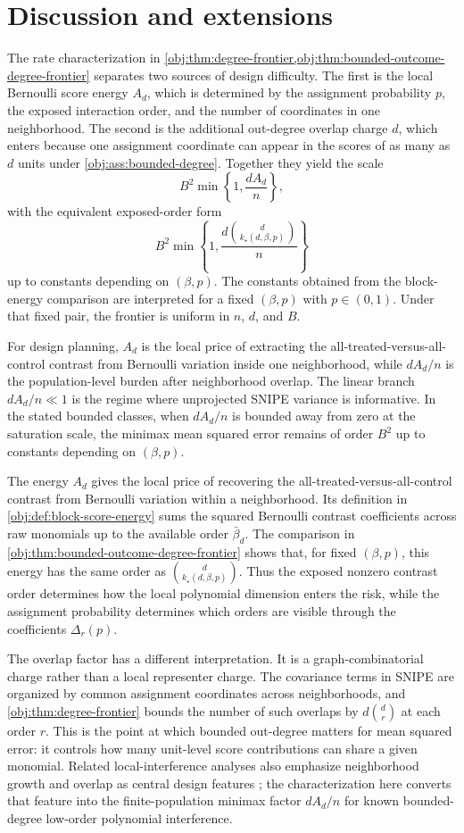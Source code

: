 \section{Discussion and extensions}

The rate characterization in \cref{obj:thm:degree-frontier,obj:thm:bounded-outcome-degree-frontier} separates two sources of design difficulty. The first is the local Bernoulli score energy \(A_d\), which is determined by the assignment probability \(p\), the exposed interaction order, and the number of coordinates in one neighborhood. The second is the additional out-degree overlap charge \(d\), which enters because one assignment coordinate can appear in the scores of as many as \(d\) units under \cref{obj:ass:bounded-degree}. Together they yield the scale
\[
B^2\min\left\{1,\frac{dA_d}{n}\right\},
\]
with the equivalent exposed-order form
\[
B^2\min\left\{1,\frac{d\binom d{k_\star(d,\beta,p)}}{n}\right\}
\]
up to constants depending on \((\beta,p)\). The constants obtained from the block-energy comparison are interpreted for a fixed \((\beta,p)\) with \(p\in(0,1)\). Under that fixed pair, the frontier is uniform in \(n\), \(d\), and \(B\).

For design planning, \(A_d\) is the local price of extracting the all-treated-versus-all-control contrast from Bernoulli variation inside one neighborhood, while \(dA_d/n\) is the population-level burden after neighborhood overlap. The linear branch \(dA_d/n\ll1\) is the regime where unprojected SNIPE variance is informative. In the stated bounded classes, when \(dA_d/n\) is bounded away from zero at the saturation scale, the minimax mean squared error remains of order \(B^2\) up to constants depending on \((\beta,p)\).

The energy \(A_d\) gives the local price of recovering the all-treated-versus-all-control contrast from Bernoulli variation within a neighborhood. Its definition in \cref{obj:def:block-score-energy} sums the squared Bernoulli contrast coefficients across raw monomials up to the available order \(\bar\beta_d\). The comparison in \cref{obj:thm:bounded-outcome-degree-frontier} shows that, for fixed \((\beta,p)\), this energy has the same order as \(\binom d{k_\star(d,\beta,p)}\). Thus the exposed nonzero contrast order determines how the local polynomial dimension enters the risk, while the assignment probability determines which orders are visible through the coefficients \(\Delta_r(p)\).

The overlap factor has a different interpretation. It is a graph-combinatorial charge rather than a local representer charge. The covariance terms in SNIPE are organized by common assignment coordinates across neighborhoods, and \cref{obj:thm:degree-frontier} bounds the number of such overlaps by \(d\binom d r\) at each order \(r\). This is the point at which bounded out-degree matters for mean squared error: it controls how many unit-level score contributions can share a given monomial. Related local-interference analyses also emphasize neighborhood growth and overlap as central design features \citep{Savje2021,Leung2022,Hu2022,Gao2025}; the characterization here converts that feature into the finite-population minimax factor \(dA_d/n\) for known bounded-degree low-order polynomial interference.

